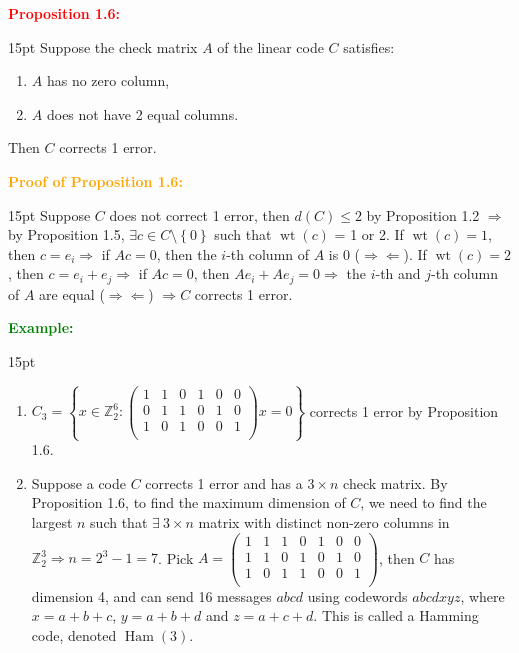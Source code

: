 \documentclass[12pt]{article}
\newcommand{\noparskip}{\vspace{-\parskip}}
\newenvironment{points}
	{\begin{enumerate}[label = (\arabic*)]}
	{\end{enumerate}}
\newenvironment{dent}
	{\begin{adjustwidth}{15pt}{}\noparskip}
	{\end{adjustwidth}}
\newenvironment{result}[1]
	{\textcolor{Red}{\textbf{#1:}}\begin{dent}}
	{\end{dent}}
\newenvironment{proof}[1]
	{\textcolor{Orange}{\textbf{Proof of #1:}}\begin{dent}}
	{\end{dent}}
\newenvironment{example}
	{\textcolor{Green}{\textbf{Example:}}\begin{dent}}
	{\end{dent}}
\renewcommand{\implies}{\Rightarrow}
\newcommand{\contradiction}{\Rightarrow \Leftarrow}
\newcommand{\set}[1]{\left\{ #1 \right\}}
\newcommand{\Z}{\mathbb{Z}}
\newcommand{\wt}[1]{\operatorname{wt}(#1)}
\newcommand{\Ham}[1]{\operatorname{Ham}(#1)}
\begin{document}
\begin{result}{Proposition 1.6}
Suppose the check matrix $A$ of the linear code $C$ satisfies:
\noparskip
\begin{points}
\item $A$ has no zero column,
\item $A$ does not have 2 equal columns.
\end{points}
\noparskip
Then $C$ corrects 1 error.
\end{result}

\begin{proof}{Proposition 1.6}
Suppose $C$ does not correct 1 error, then $d(C) \le 2$ by Proposition 1.2 $\implies$ by Proposition 1.5, $\exists c \in C \setminus \set{0}$ such that $\wt{c}$ = 1 or 2. If $\wt{c} = 1$, then $c = e_i \implies$ if $Ac = 0$, then the $i$-th column of $A$ is 0 ($\contradiction$). If $\wt{c} = 2$, then $c = e_i + e_j \implies$ if $Ac = 0$, then $Ae_i + Ae_j = 0 \implies$ the $i$-th and $j$-th column of $A$ are equal ($\contradiction$) $\implies C$ corrects 1 error.
\end{proof}

\begin{example}
\begin{points}
\item $C_3 = \set{x \in \Z_2^6: \begin{pmatrix}
1 & 1 & 0 & 1 & 0 & 0 \\
0 & 1 & 1 & 0 & 1 & 0 \\
1 & 0 & 1 & 0 & 0 & 1 \\
\end{pmatrix} x = 0}$ corrects 1 error by Proposition 1.6.
\item Suppose a code $C$ corrects 1 error and has a $3 \times n$ check matrix. By Proposition 1.6, to find the maximum dimension of $C$, we need to find the largest $n$ such that $\exists\ 3 \times n$ matrix with distinct non-zero columns in $\Z_2^3 \implies n = 2^3 - 1 = 7$. Pick $A = \begin{pmatrix}
1 & 1 & 1 & 0 & 1 & 0 & 0 \\
1 & 1 & 0 & 1 & 0 & 1 & 0 \\
1 & 0 & 1 & 1 & 0 & 0 & 1 \\
\end{pmatrix}$, then $C$ has dimension 4, and can send 16 messages $abcd$ using codewords $abcdxyz$, where $x = a + b + c$, $y = a + b + d$ and $z = a + c + d$. This is called a Hamming code, denoted $\Ham{3}$.
\end{points}
\end{example}
\end{document}
